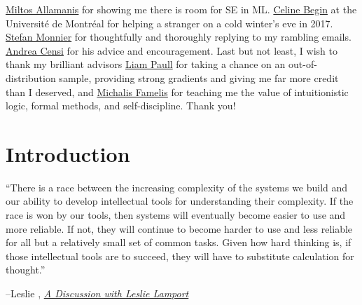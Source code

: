 \documentclass[12pt,initial,twoside,maitrise]{dms}
\numberwithin{equation}{section}
\numberwithin{table}{chapter}
\numberwithin{figure}{chapter}
\begin{document}
\href{https://miltos.allamanis.com/}{Miltos Allamanis} for showing me there is room for SE in ML. \href{https://diro.umontreal.ca/accueil/}{Celine Begin} at the Universit\'e de Montr\'eal for helping a stranger on a cold winter's eve in 2017. \href{https://www.iro.umontreal.ca/~monnier/}{Stefan Monnier} for thoughtfully and thoroughly replying to my rambling emails. \href{https://censi.science/}{Andrea Censi} for his advice and encouragement. Last but not least, I wish to thank my brilliant advisors \href{http://liampaull.ca/}{Liam Paull} for taking a chance on an out-of-distribution sample, providing strong gradients and giving me far more credit than I deserved, and \href{https://michalis.famelis.info/}{Michalis Famelis} for teaching me the value of intuitionistic logic, formal methods, and self-discipline. Thank you!


\anglais
\cleardoublepage
{}  %
\tableofcontents
\cleardoublepage
\listoftables
\cleardoublepage
\listoffigures

\NoChapterPageNumber
\cleardoublepage
{}

\chapter{Introduction}\label{ch:introduction}

\setlength{\epigraphwidth}{0.85\textwidth}
\epigraph{``There is a race between the increasing complexity of the systems we build and our ability to develop intellectual tools for understanding their complexity. If the race is won by our tools, then systems will eventually become easier to use and more reliable. If not, they will continue to become harder to use and less reliable for all but a relatively small set of common tasks. Given how hard thinking is, if those intellectual tools are to succeed, they will have to substitute calculation for thought.''}{\begin{flushright}--Leslie \citet{lamport2002discussion}, \href{https://www.microsoft.com/en-us/research/uploads/prod/2016/12/A-Discussion-With-Leslie-Lamport.pdf}{\textit{A Discussion with Leslie Lamport}}\end{flushright}}
\end{document}
